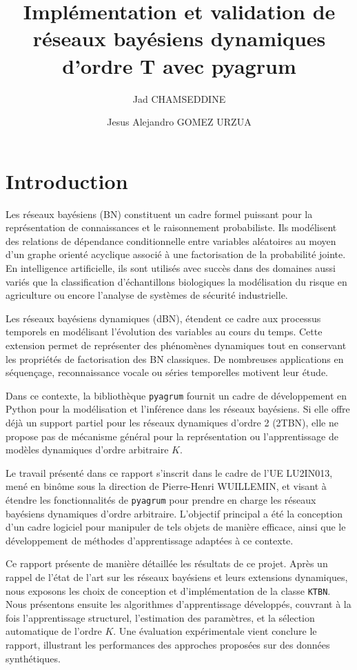 \documentclass{article}
\title{Implémentation et validation de réseaux bayésiens dynamiques d'ordre T avec pyagrum}
\author{Jad CHAMSEDDINE \and Jesus Alejandro GOMEZ URZUA}
\begin{document}
\maketitle

\setcounter{tocdepth}{2}
\tableofcontents

\section{Introduction}


Les réseaux bayésiens (BN) constituent un cadre formel puissant pour la représentation de connaissances et le raisonnement
probabiliste. Ils modélisent des relations de dépendance conditionnelle entre variables aléatoires au moyen d'un graphe
orienté acyclique associé à une factorisation de la probabilité jointe. En intelligence artificielle, ils sont utilisés
avec succès dans des domaines aussi variés que la classification d'échantillons biologiques\cite{doi:10.1021/jf9013235}
la modélisation du risque en agriculture\cite{BRESSAN2009579} ou encore l'analyse de systèmes de sécurité
industrielle\cite{KANNAN2007255}.

Les réseaux bayésiens dynamiques (dBN), étendent ce cadre aux processus temporels en modélisant l'évolution des variables
au cours du temps. Cette extension permet de représenter des phénomènes dynamiques tout en conservant les propriétés de
factorisation des BN classiques. De nombreuses applications en séquençage, reconnaissance vocale ou séries temporelles
motivent leur étude. \cite{perrin2003gene, zweig1998speech}

Dans ce contexte, la bibliothèque \texttt{pyagrum} fournit un cadre de développement en Python pour la modélisation et
l'inférence dans les réseaux bayésiens. Si elle offre déjà un support partiel pour les réseaux dynamiques d'ordre 2
(2TBN), elle ne propose pas de mécanisme général pour la représentation ou l'apprentissage de modèles dynamiques d'ordre
arbitraire $K$.

Le travail présenté dans ce rapport s'inscrit dans le cadre de l'UE LU2IN013, mené en binôme sous la direction de
Pierre-Henri WUILLEMIN, et visant à étendre les fonctionnalités de \texttt{pyagrum} pour prendre en charge les réseaux
bayésiens dynamiques d'ordre arbitraire. L'objectif principal a été la conception d'un cadre logiciel pour manipuler de
tels objets de manière efficace, ainsi que le développement de méthodes d'apprentissage adaptées à ce contexte.

Ce rapport présente de manière détaillée les résultats de ce projet. Après un rappel de l'état de l'art sur les réseaux
bayésiens et leurs extensions dynamiques, nous exposons les choix de conception et d'implémentation de la classe
\texttt{KTBN}. Nous présentons ensuite les algorithmes d'apprentissage développés, couvrant à la fois l'apprentissage
structurel, l'estimation des paramètres, et la sélection automatique de l'ordre $K$. Une évaluation expérimentale
vient conclure le rapport, illustrant les performances des approches proposées sur des données synthétiques.
\end{document}
